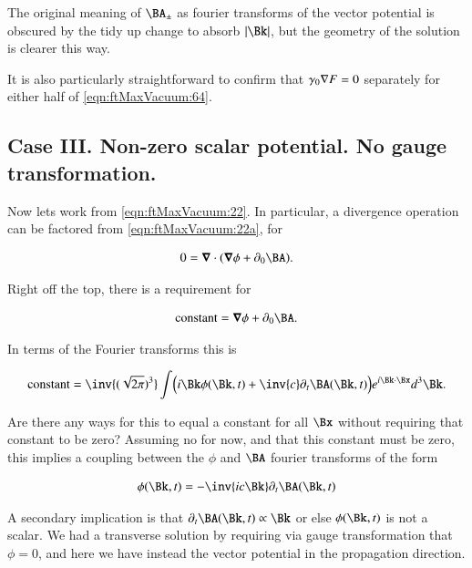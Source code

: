 The original meaning of $\BA_{\pm}$ as fourier transforms of the vector potential is obscured by the tidy up change to absorb $\Abs{\Bk}$, but the geometry of the solution is clearer this way.

It is also particularly straightforward to confirm that $\gamma_0 \nabla F = 0$ separately for either half of \autoref{eqn:ftMaxVacuum:64}.

\subsection{Case III.  Non-zero scalar potential.  No gauge transformation.}

Now lets work from \autoref{eqn:ftMaxVacuum:22}.  In particular, a divergence operation can be factored from \autoref{eqn:ftMaxVacuum:22a}, for

\begin{align}\label{eqn:ftMaxVacuum:70}
0 = \spacegrad \cdot (\spacegrad \phi + \partial_0 \BA).
\end{align}

Right off the top, there is a requirement for 

\begin{align}\label{eqn:ftMaxVacuum:71}
\text{constant} = \spacegrad \phi + \partial_0 \BA.
\end{align}

In terms of the Fourier transforms this is

\begin{align}\label{eqn:ftMaxVacuum:72}
\text{constant} = 
\inv{(\sqrt{2 \pi})^3} \int 
\Bigl(
i \Bk \phi(\Bk, t) + \inv{c} \partial_t \BA(\Bk, t)
\Bigr)
e^{i \Bk \cdot \Bx } d^3 \Bk.
\end{align}

Are there any ways for this to equal a constant for all $\Bx$ without requiring that constant to be zero?  Assuming no for now, and that this constant must be zero, this implies a coupling between the $\phi$ and $\BA$ fourier transforms of the form

\begin{align}
\label{eqn:ftMaxVacuum:73}
\phi(\Bk, t) = -\inv{i c \Bk} \partial_t \BA(\Bk, t)
\end{align}

A secondary implication is that $\partial_t \BA(\Bk, t) \propto \Bk$ or else $\phi(\Bk, t)$ is not a scalar.  We had a transverse solution by requiring via gauge transformation that $\phi = 0$, and here we have instead the vector potential in the propagation direction.

